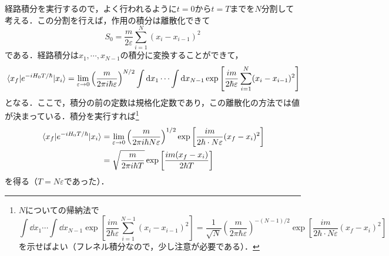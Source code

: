 \documentclass[a4paper,pdflatex,ja=standard]{bxjsarticle}
\begin{document}
経路積分を実行するので，よく行われるように$t=0$から$t=T$までを$N$分割して考える．この分割を行えば，作用の積分は離散化できて
\begin{equation}
  S_{0}
  =
  \frac{m}{2\varepsilon}
  \sum_{i=1}^{N}
  (x_{i}-x_{i-1})^2
\end{equation}
である．経路積分は$x_1,\cdots,x_{N-1}$の積分に変換することができて，
\begin{equation}
  \ev*{x_{f}|e^{-iH_0T/\hbar}|x_i}  
  =
  \lim_{\varepsilon\rightarrow 0}
  \left(  
    \frac{m}{2\pi i\hbar \varepsilon}
  \right)^{N/2}
  \int\dd x_1\cdots\int\dd x_{N-1}
  \exp
  \left[  
    \frac{im}{2\hbar\varepsilon}
    \sum_{i=1}^{N}
    (x_{i}-x_{i-1})^2    
  \right]
\end{equation}
となる．ここで，積分の前の定数は規格化定数であり，この離散化の方法では値が決まっている．積分を実行すれば\footnote{
  $N$についての帰納法で
  $$
    \int\dd x_1\cdots\int\dd x_{N-1}
    \exp\left[ \frac{im}{2\hbar\varepsilon}\sum_{i=1}^{N-1}(x_i-x_{i-1})^2 \right]
    =
    \frac{1}{\sqrt{N}}
    \left(  
      \frac{m}{2\pi\hbar \varepsilon}
    \right)^{-(N-1)/2}
    \exp
    \left[ \frac{im}{2\hbar\cdot N\varepsilon}(x_f-x_i)^2 \right]    
  $$
  を示せばよい（フレネル積分なので，少し注意が必要である）．
}
\begin{align}
  \ev*{x_{f}|e^{-iH_0T/\hbar}|x_i}  
  &=
  \lim_{\varepsilon\rightarrow 0}
  \left(  
    \frac{m}{2\pi i\hbar N\varepsilon}
  \right)^{1/2}
  \exp
  \left[ \frac{im}{2\hbar\cdot N\varepsilon}(x_f-x_i)^2 \right]
  \nonumber
  \\
  &=
  \sqrt{\frac{m}{2\pi i\hbar T}}
  \exp
  \left[  
    \frac{im(x_f-x_i)}{2\hbar T}
  \right]
\end{align}
を得る（$T=N\varepsilon$であった）．
\end{document}
